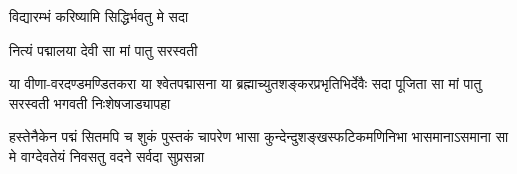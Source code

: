 
{विद्यारम्भं करिष्यामि सिद्धिर्भवतु मे सदा}

{नित्यं पद्मालया देवी सा मां पातु सरस्वती}

{या वीणा-वरदण्डमण्डितकरा या श्वेतपद्मासना}
{या ब्रह्माच्युतशङ्करप्रभृतिभिर्देवैः सदा पूजिता}
{सा मां पातु सरस्वती भगवती निःशेषजाड्यापहा}

{हस्तेनैकेन पद्मं सितमपि च शुकं पुस्तकं चापरेण}
{भासा कुन्देन्दुशङ्खस्फटिकमणिनिभा भासमानाऽसमाना}
{सा मे वाग्देवतेयं निवसतु वदने सर्वदा सुप्रसन्ना}

\closesection